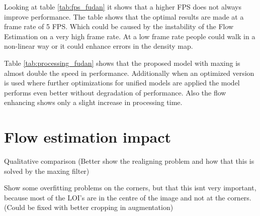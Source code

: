 Looking at table \ref{tab:fps_fudan} it shows that a higher FPS does not always improve performance. The table shows that the optimal results are made at a frame rate of 5 FPS. Which could be caused by the instability of the Flow Estimation on a very high frame rate. At a low frame rate people could walk in a non-linear way or it could enhance errors in the density map.

Table \ref{tab:processing_fudan} shows that the proposed model with maxing is almost double the speed in performance. Additionally when an optimized version is used where further optimizations for unified models are applied the model performs even better without degradation of performance. Also the flow enhancing shows only a slight increase in processing time.


\section{Flow estimation impact}
Qualitative comparison (Better show the realigning problem and how that this is solved by the maxing filter)

Show some overfitting problems on the corners, but that this isnt very important, because most of the LOI's are in the centre of the image and not at the corners. (Could be fixed with better cropping in augmentation)